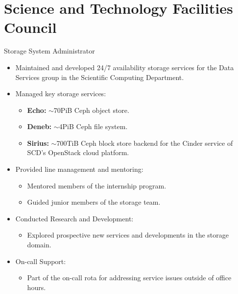 \documentclass[10pt]{beamer}
\begin{document}
  \section{Science and Technology Facilities Council}
  \begin{frame}{Storage System Administrator}
    \begin{itemize}
      \item Maintained and developed 24/7 availability storage services for the
      Data Services group in the Scientific Computing Department.
      
      \item Managed key storage services:
        \begin{itemize}
          \item \textbf{Echo:} $\sim$70PiB Ceph object store.
          \item \textbf{Deneb:} $\sim$4PiB Ceph file system.
          \item \textbf{Sirius:} $\sim$700TiB Ceph block store
          backend for the Cinder service of SCD's OpenStack cloud platform.
        \end{itemize}
  
      \item Provided line management and mentoring:
        \begin{itemize}
          \item Mentored members of the internship program.
          \item Guided junior members of the storage team.
        \end{itemize}
  
      \item Conducted Research and Development:
        \begin{itemize}
          \item Explored prospective new services and developments in the
          storage domain.
        \end{itemize}
  
      \item On-call Support:
        \begin{itemize}
          \item Part of the on-call rota for addressing service issues outside
          of office hours.
        \end{itemize}
    \end{itemize}
  \end{frame}
\end{document}
